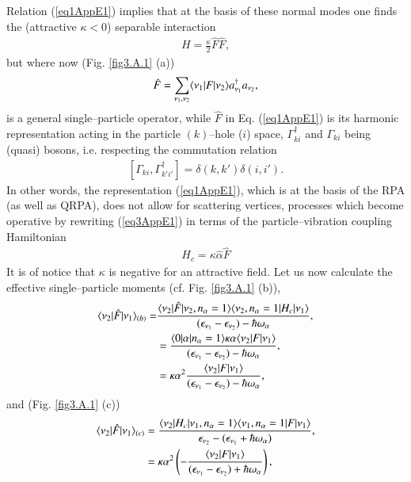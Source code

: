 \begin{subappendices}
Relation (\ref{eq1AppE1}) implies that at the basis of these normal modes one finds the (attractive $\kappa<0$) separable interaction 
\begin{align}\label{eq3AppE1}
H=\frac{\kappa}{2}\hat F\hat F,
\end{align}
but where now (Fig. \ref{fig3.A.1} (a))
\begin{align}
\hat F=\sum_{\nu_1,\nu_2} \langle {\nu_1|F|\nu_2} \rangle a^\dagger_{\nu_1}a_{\nu_2},
\end{align}
is a general single--particle operator, while $\hat F$ in  Eq. (\ref{eq1AppE1}) is its harmonic representation acting in the particle $(k)$--hole ($i$) space, $\Gamma^\dagger_{ki}$ and $\Gamma_{ki}$ being (quasi) bosons, i.e. respecting the commutation relation 
\begin{align}
\left[\Gamma_{ki},\Gamma^\dagger_{k'i'}\right]=\delta(k,k')\delta(i,i').
\end{align}
In other words, the representation (\ref{eq1AppE1}), which is at the basis of the RPA (as well as QRPA), does not allow for scattering vertices, processes which become operative by rewriting (\ref{eq3AppE1}) in terms of the particle--vibration coupling Hamiltonian
\begin{align}\label{eq3AppE4}
H_c=\kappa\hat \alpha\hat F
\end{align}
It is of notice that $\kappa$ is negative for an attractive field. Let us now calculate the effective single--particle moments (cf. Fig. \ref{fig3.A.1} (b)),
\begin{align}
\nonumber \langle {\nu_2|\hat F|\nu_1} \rangle_{(b)}=&\frac{\langle {\nu_2|\hat F|\nu_2,n_\alpha=1} \rangle\langle {\nu_2,n_\alpha=1|H_c|\nu_1} \rangle}{(\epsilon_{\nu_1}-\epsilon_{\nu_2})-\hbar\omega_\alpha},\\
\nonumber &=\frac{\langle {0|\alpha|n_\alpha=1} \rangle\kappa\alpha \langle {\nu_2|F|\nu_1} \rangle}{(\epsilon_{\nu_1}-\epsilon_{\nu_2})-\hbar\omega_\alpha},\\
&=\kappa\alpha^2\frac{ \langle {\nu_2|F|\nu_1} \rangle}{(\epsilon_{\nu_1}-\epsilon_{\nu_2})-\hbar\omega_\alpha},
\end{align}
and (Fig. \ref{fig3.A.1} (c))
\begin{align}\label{eq8App1E}
\nonumber \langle {\nu_2|\hat F|\nu_1} \rangle_{(c)}&=\frac{\langle {\nu_2|H_c|\nu_1,n_\alpha=1} \rangle\langle {\nu_1,n_\alpha=1| F|\nu_1} \rangle}{\epsilon_{\nu_2}-(\epsilon_{\nu_1}+\hbar\omega_\alpha)},\\
&=\kappa\alpha^2\left(-\frac{\langle {\nu_2|F|\nu_1} \rangle}{(\epsilon_{\nu_1}-\epsilon_{\nu_2})+\hbar\omega_\alpha}\right),
\end{align}

\end{subappendices}
